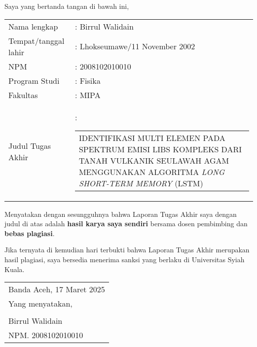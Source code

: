 \bplagiasi %
\onehalfspacing
\noindent
Saya yang bertanda tangan di bawah ini,

\vspace{0.2cm}
\noindent
\begin{center}
	\begin{tabularx}{0.9\textwidth}{@{} l X @{}} %
		Nama lengkap          & : Birrul Walidain \\
		Tempat/tanggal lahir  & : Lhokseumawe/11 November 2002 \\
		NPM                   & : 2008102010010 \\
		Program Studi         & : Fisika \\
		Fakultas              & : MIPA \\
		Judul Tugas Akhir     & : 
		\begin{tabular}[t]{@{}p{\linewidth}@{}}
			IDENTIFIKASI MULTI ELEMEN PADA SPEKTRUM EMISI LIBS KOMPLEKS DARI 
			TANAH VULKANIK SEULAWAH AGAM MENGGUNAKAN ALGORITMA 
			\textit{LONG SHORT-TERM MEMORY} (LSTM)
		\end{tabular} \\
	\end{tabularx}
\end{center}



\vspace{0.2cm}
\noindent
Menyatakan dengan sesungguhnya bahwa Laporan Tugas Akhir saya dengan judul di atas adalah \textbf{hasil karya saya sendiri} bersama dosen pembimbing dan \textbf{bebas plagiasi}.

\vspace{0.2cm}
\noindent
Jika ternyata di kemudian hari terbukti bahwa Laporan Tugas Akhir merupakan hasil plagiasi, saya bersedia menerima sanksi yang berlaku di Universitas Syiah Kuala.

\vspace{1cm}
\begin{onehalfspace}
	\begin{flushright} %
		\begin{tabular}{l@{}}
			Banda Aceh, 17 Maret 2025 \\[-0.15cm]
			Yang menyatakan, \\
			\\[1.5cm] %
			Birrul Walidain \\[-0.15cm]
			NPM. 2008102010010 \\
		\end{tabular}
	\end{flushright}
\end{onehalfspace}

